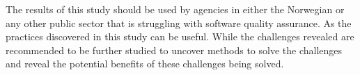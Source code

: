 The results of this study should be used by agencies in either the Norwegian or any other public sector that is struggling with software quality assurance. As the practices discovered in this study can be useful. While the challenges revealed are recommended to be further studied to uncover methods to solve the challenges and reveal the potential benefits of these challenges being solved.